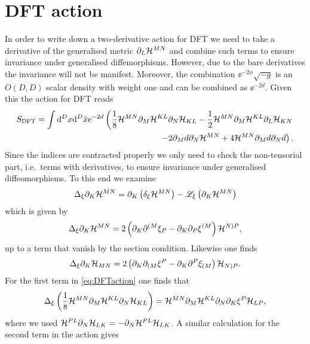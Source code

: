 \section{DFT action}
In order to write down a two-derivative action for DFT we need to take a derivative of the generalised metric $\partial_L\mathcal{H}^{MN}$ and combine such terms to ensure invariance under generalised diffemorphisms. However, due to the bare derivatives the invariance will not be manifest. Moreover, the combination $\ee^{-2\phi}\sqrt{-g}$ is an $O(D,D)$ scalar density with weight one and can be combined as $\ee^{-2d}$. Given this the action for DFT reads
\begin{equation}
\begin{aligned}\label{eq:DFTaction}
    S_{\text{DFT}} = \int \mathrm{d}^Dx\mathrm{d}^D\tilde{x} \mathrm{e}^{-2d}\left(\frac{1}{8}\mathcal{H}^{MN}\partial_M\mathcal{H}^{KL}\partial_N\mathcal{H}_{KL}-\frac{1}{2}\mathcal{H}^{MN}\partial_M\mathcal{H}^{KL}\partial_L\mathcal{H}_{KN}\right.\\
    \left. -2\partial_M d\partial_N\mathcal{H}^{MN}+4\mathcal{H}^{MN}\partial_M d\partial_N d\right).
\end{aligned}
\end{equation}
Since the indices are contracted properly we only need to check the non-tensorial part, i.e.\ terms with derivatives, to ensure invariance under generalised diffeomorphisms. To this end we examine
\begin{equation}
    \Delta_\xi \partial_K \mathcal{H}^{MN} = \partial_K\left(\delta_\xi\mathcal{H}^{MN}\right)-\mathscr{L}_\xi\left(\partial_K\mathcal{H}^{MN}\right)
\end{equation}
which is given by 
\begin{equation}
    \Delta_\xi \partial_K \mathcal{H}^{MN} = 2\left(\partial_K\partial^{(M}\xi_P-\partial_K\partial_P\xi^{(M}\right)\mathcal{H}^{N)P},
\end{equation}
up to a term that vanish by the section condition. Likewise one finds 
\begin{equation}
    \Delta_\xi \partial_K\mathcal{H}_{MN} = 2\left(\partial_K\partial_{(M}\xi^P-\partial_K\partial^P\xi_{(M}\right)\mathcal{H}_{N)P}.
\end{equation}
For the first term in \eqref{eq:DFTaction} one finds that 
\begin{equation}\label{eq:dftvar1}
    \Delta_\xi\left(\frac{1}{8}\mathcal{H}^{MN}\partial_M\mathcal{H}^{KL}\partial_N\mathcal{H}_{KL}\right) = \mathcal{H}^{MN}\partial_M\mathcal{H}^{KL}\partial_N\partial_K\xi^P\mathcal{H}_{LP},
\end{equation}
where we used $\mathcal{H}^{PL}\partial_N\mathcal{H}_{LK}=-\partial_N\mathcal{H}^{PL}\mathcal{H}_{LK}$. A similar calculation for the second term in the action gives 
